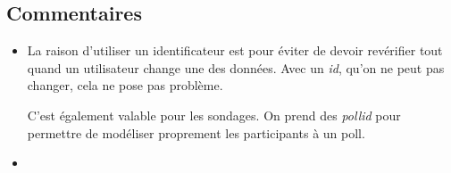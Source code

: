 \documentclass{article}
\begin{document}
\subsection{Commentaires}

    \begin{itemize}
        \item La raison d'utiliser un identificateur est pour éviter de devoir revérifier tout quand un utilisateur change une des données. Avec un \textit{id}, qu'on ne peut pas changer, cela ne pose pas problème.

        C'est également valable pour les sondages. On prend des \textit{pollid} pour permettre de modéliser proprement les participants à un poll.
        \item 
    \end{itemize}
\end{document}
